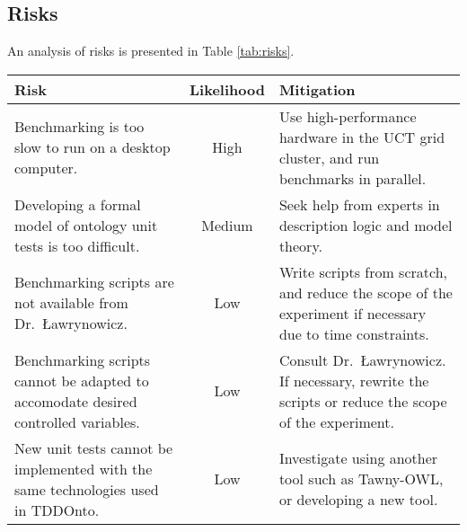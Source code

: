 \documentclass[draft]{sig-alternate}
\begin{document}
\subsection{Risks}

An analysis of risks is presented in Table \ref{tab:risks}.

\begin{table*}
  \caption{Analysis of risks}
  \label{tab:risks}
  \vspace{6pt}
  \setlength{\extrarowheight}{4pt}
  \begin{tabularx}{\textwidth}{XcX}
    Risk & Likelihood & Mitigation \\ \hline
    Benchmarking is too slow to run on a desktop computer. &
    High &
    Use high-performance hardware in the UCT grid cluster, and run benchmarks in parallel. \\
    Developing a formal model of ontology unit tests is too difficult. &
    Medium &
    Seek help from experts in description logic and model theory. \\
    Benchmarking scripts are not available from Dr.\ {\L}awrynowicz. &
    Low &
    Write scripts from scratch, and reduce the scope of the experiment if necessary due to time constraints. \\
    Benchmarking scripts cannot be adapted to accomodate desired controlled variables. &
    Low &
    Consult Dr.\ {\L}awrynowicz.  If necessary, rewrite the scripts or reduce the scope of the experiment. \\
    New unit tests cannot be implemented with the same technologies used in TDDOnto. &
    Low &
    Investigate using another tool such as Tawny-OWL, or developing a new tool.
  \end{tabularx}
\end{table*}



\end{document}
